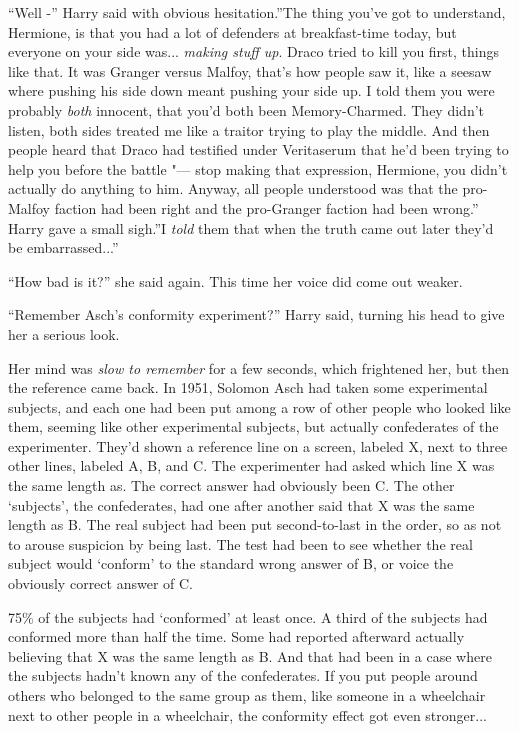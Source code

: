 ``Well -'' Harry said with obvious hesitation.''The thing you've got to
understand, Hermione, is that you had a lot of defenders at
breakfast-time today, but everyone on your side was... \emph{making
stuff up}. Draco tried to kill you first, things like that. It was
Granger versus Malfoy, that's how people saw it, like a seesaw where
pushing his side down meant pushing your side up. I told them you were
probably \emph{both} innocent, that you'd both been Memory-Charmed. They
didn't listen, both sides treated me like a traitor trying to play the
middle. And then people heard that Draco had testified under Veritaserum
that he'd been trying to help you before the battle "--- stop making that
expression, Hermione, you didn't actually do anything to him. Anyway,
all people understood was that the pro-Malfoy faction had been right and
the pro-Granger faction had been wrong.'' Harry gave a small sigh.''I
\emph{told} them that when the truth came out later they'd be
embarrassed...''

``How bad is it?'' she said again. This time her voice did come out
weaker.

``Remember Asch's conformity experiment?'' Harry said, turning his head
to give her a serious look.

Her mind was \emph{slow to remember} for a few seconds, which frightened
her, but then the reference came back. In 1951, Solomon Asch had taken
some experimental subjects, and each one had been put among a row of
other people who looked like them, seeming like other experimental
subjects, but actually confederates of the experimenter. They'd shown a
reference line on a screen, labeled X, next to three other lines,
labeled A, B, and C. The experimenter had asked which line X was the
same length as. The correct answer had obviously been C. The other
`subjects', the confederates, had one after another said that X was the
same length as B. The real subject had been put second-to-last in the
order, so as not to arouse suspicion by being last. The test had been to
see whether the real subject would `conform' to the standard wrong
answer of B, or voice the obviously correct answer of C.

75\% of the subjects had `conformed' at least once. A third of the
subjects had conformed more than half the time. Some had reported
afterward actually believing that X was the same length as B. And that
had been in a case where the subjects hadn't known any of the
confederates. If you put people around others who belonged to the same
group as them, like someone in a wheelchair next to other people in a
wheelchair, the conformity effect got even stronger...

